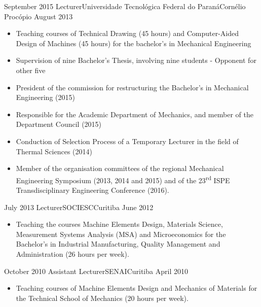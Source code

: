 \begin{experiences}
  \experience
    {September 2015}   {Lecturer}{Universidade Tecnológica Federal do Paraná}{Cornélio Procópio}
    {August 2013} {
                      \begin{itemize}
                        \item Teaching courses of Technical Drawing (45 hours) and Computer-Aided Design of Machines (45 hours) for the bachelor's in Mechanical Engineering
                        \item Supervision of nine Bachelor's Thesis, involving nine students - Opponent for other five
                        \item President of the commission for restructuring the Bachelor's in Mechanical Engineering (2015)                   
                        \item Responsible for the Academic Department of Mechanics, and member of the Department Council (2015)                
                        \item Conduction of Selection Process of a Temporary Lecturer in the field of Thermal Sciences (2014)
                        \item Member of the organisation committees of the regional Mechanical Engineering Symposium (2013, 2014 and 2015) and of the 23\textsuperscript{rd} ISPE Transdisciplinary Engineering Conference (2016).
                      \end{itemize} 
                    }
                
  \emptySeparator
  \experience
    {July 2013} {Lecturer}{SOCIESC}{Curitiba}
    {June 2012}    {
                      \begin{itemize}
                        \item Teaching the courses Machine Elements Design, Materials Science, Measurement Systems Analysis (MSA) and Microeconomics for the Bachelor's in Industrial Manufacturing, Quality Management and Administration (26 hours per week).
                      \end{itemize}
                    }
                
  \emptySeparator
  \experience
    {October 2010} {Assistant Lecturer}{SENAI}{Curitiba}
    {April 2010}    {
                      \begin{itemize}
                        \item Teaching courses of Machine Elements Design and Mechanics of Materials for the Technical School of Mechanics (20 hours per week).
                      \end{itemize}
                    }
            

\end{experiences}
